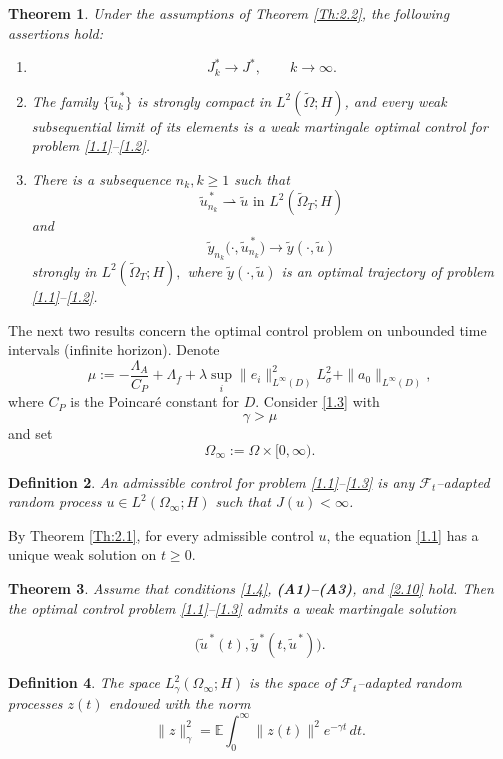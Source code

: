 \documentclass[a4paper,12pt]{article}
\newtheorem{definition}{Definition}[section]
\newtheorem{theorem}[definition]{Theorem}
\numberwithin{equation}{section}
\def\E{\mathbb{E}}
\begin{document}
\begin{theorem}\label{Th:2.3}
Under the assumptions of Theorem \eqref{Th:2.2}, the following
assertions hold:

\begin{enumerate}
\item
\[
J_k^{*}\to J^{*},
\qquad
k\to\infty.
\]

\item
The family $\{\widetilde u_k^{\,*}\}$
is strongly compact in $
L^2(\widetilde\Omega;H)
$,
and every weak subsequential limit of its elements
is a weak martingale optimal control for problem
\eqref{1.1}--\eqref{1.2}.

\item There is a subsequence $n_k, k \geq 1$ such that 
\[
\widetilde  u_{n_k}^{\,*} \rightharpoonup \widetilde  u \text{ in } L^2(\widetilde\Omega_T;H)
\]
and
\[
\widetilde y_{n_k}
\bigl(\cdot,\widetilde u_{n_k}^{\,*}\bigr)
\to
\widetilde y(\cdot,\widetilde u)
\]
strongly in
$
L^2(\widetilde\Omega_T;H),
$ where 
$
\widetilde y(\cdot,\widetilde u)
$
is an optimal trajectory of problem
\eqref{1.1}--\eqref{1.2}.
\end{enumerate}
\end{theorem}
The next two results concern the optimal control problem on unbounded time intervals (infinite horizon). Denote
\begin{equation}
\mu
:=
-\frac{\Lambda_A}{C_P}
+\Lambda_f
+\lambda
\sup_i \|e_i\|_{L^\infty(D)}^2
L_\sigma^2
+\|a_0\|_{L^\infty(D)} ,
\label{astast}
\end{equation}
where $C_P$ is the Poincar\'e constant for $D$.
Consider 
\eqref{1.3} with 
\begin{equation}\label{2.10}
    \gamma > \mu
\end{equation}
and set
\[
\Omega_\infty :=\Omega\times[0,\infty).
\]


\begin{definition}
An {\it admissible control  for problem
 \eqref{1.1}--\eqref{1.3}}
is any $\mathcal F_t$--adapted random process $u\in L^2(\Omega_\infty;H)$
such that $J(u)<\infty$.
\end{definition}

By Theorem \ref{Th:2.1}, for every admissible control $u$, the
equation \eqref{1.1} has a unique weak solution on
$t\ge0$.

\begin{theorem}\label{Th:2.4}
Assume that conditions \eqref{1.4},
{{\bf \rm(A1)--(A3)}}, and \eqref{2.10} hold.
Then the optimal control problem
\eqref{1.1}--\eqref{1.3}
admits a weak martingale solution

\[
\bigl(
\widetilde u^{\,*}(t),
\widetilde y^{\,*}(t,\widetilde u^{\,*})
\bigr).
\]
\end{theorem}
\begin{definition}
The space $L_\gamma^2(\Omega_\infty;H)$ is the space of $\mathcal F_t$--adapted random processes
$z(t)$ endowed with the norm
\begin{equation*}
\|z\|_\gamma^2
=
\E\int_0^\infty
\|z(t)\|^2 e^{-\gamma t}\,dt .
\end{equation*}
\end{definition}
\end{document}
